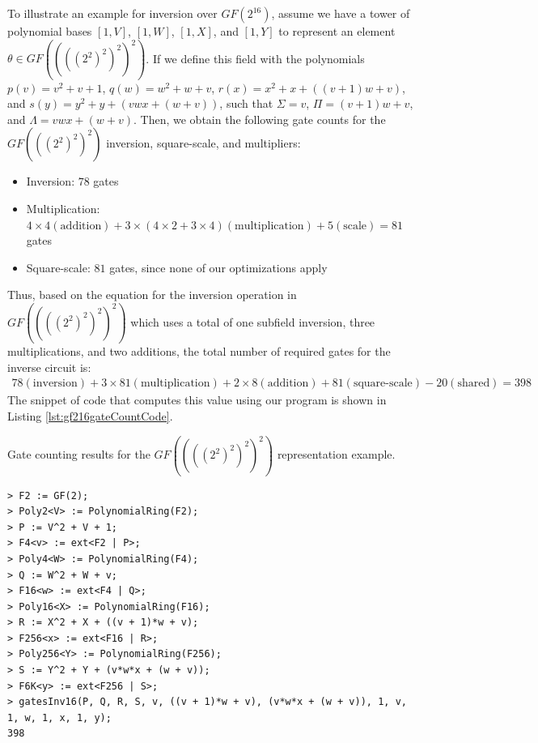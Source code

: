 To illustrate an example for inversion over $GF(2^{16})$, assume we have a tower of polynomial bases $[1, V]$, $[1, W]$, $[1, X]$, and $[1, Y]$ to represent an element $\theta \in GF((((2^2)^2)^2)^2)$. If we define this field with the polynomials $p(v) = v^2 + v + 1$, $q(w) = w^2 + w + v$, $r(x) = x^2 + x + ((v + 1)w + v)$, and $s(y) = y^2 + y + (vwx + (w + v))$, such that $\Sigma = v$, $\Pi = (v + 1)w + v$, and $\Lambda = vwx + (w + v)$. Then, we obtain the following gate counts for the $GF(((2^2)^2)^2)$ inversion, square-scale, and multipliers:
\begin{itemize}
	\item Inversion: $78$ gates
	\item Multiplication: $4 \times 4 (\text{addition}) + 3 \times (4 \times 2 + 3 \times 4) (\text{multiplication}) + 5 (\text{scale}) = 81$ gates
	\item Square-scale: $81$ gates, since none of our optimizations apply
\end{itemize}
Thus, based on the equation for the inversion operation in $GF((((2^2)^2)^2)^2)$ which uses a total of one subfield inversion, three multiplications, and two additions, the total number of required gates for the inverse circuit is:
\begin{align*}
78 (\text{inversion}) + 3 \times 81 (\text{multiplication}) + 2 \times 8 (\text{addition}) + 81 (\text{square-scale}) - 20 (\text{shared}) = 398
\end{align*}
The snippet of code that computes this value using our program is shown in Listing \ref{lst:gf216gateCountCode}.

\begin{listing}[ht!]
\caption{Gate counting results for the $GF((((2^2)^2)^2)^2)$ representation example.}
\begin{verbatim}
> F2 := GF(2);
> Poly2<V> := PolynomialRing(F2);
> P := V^2 + V + 1;
> F4<v> := ext<F2 | P>;
> Poly4<W> := PolynomialRing(F4);
> Q := W^2 + W + v;
> F16<w> := ext<F4 | Q>;
> Poly16<X> := PolynomialRing(F16);
> R := X^2 + X + ((v + 1)*w + v);
> F256<x> := ext<F16 | R>;
> Poly256<Y> := PolynomialRing(F256);
> S := Y^2 + Y + (v*w*x + (w + v));
> F6K<y> := ext<F256 | S>;
> gatesInv16(P, Q, R, S, v, ((v + 1)*w + v), (v*w*x + (w + v)), 1, v, 1, w, 1, x, 1, y);
398
\end{verbatim}
\label{lst:gf216gateCountCode}
\end{listing}

